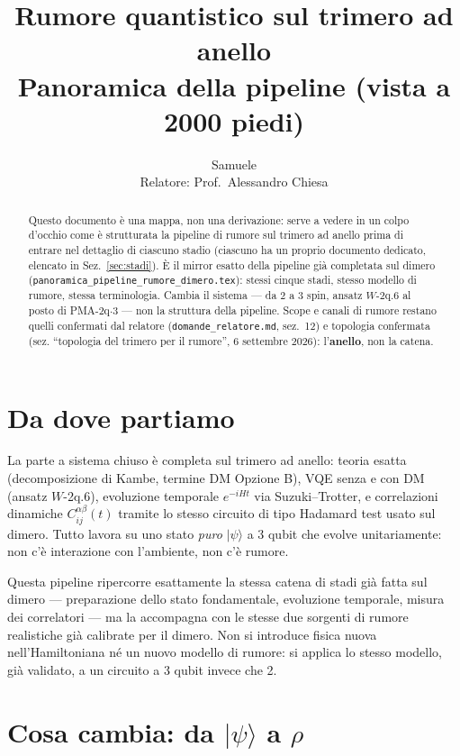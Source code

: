 \documentclass[11pt,a4paper]{article}
\title{Rumore quantistico sul trimero ad anello\\
\large Panoramica della pipeline (vista a 2000 piedi)}
\author{Samuele \\ Relatore: Prof.\ Alessandro Chiesa}
\date{}
\newcommand{\ket}[1]{\lvert #1 \rangle}
\begin{document}
\maketitle

\begin{abstract}
\noindent Questo documento è una mappa, non una derivazione: serve a
vedere in un colpo d'occhio come è strutturata la pipeline di rumore sul
trimero ad anello prima di entrare nel dettaglio di ciascuno stadio
(ciascuno ha un proprio documento dedicato, elencato in
Sez.~\ref{sec:stadi}). È il mirror esatto della pipeline già completata
sul dimero (\texttt{panoramica\_\allowbreak pipeline\_rumore\_\allowbreak dimero.tex}): stessi
cinque stadi, stesso modello di rumore, stessa terminologia. Cambia il
sistema --- da 2 a 3 spin, ansatz $W$-2q.6 al posto di PMA-2q$\cdot$3 ---
non la struttura della pipeline. Scope e canali di rumore restano quelli
confermati dal relatore (\texttt{domande\_relatore.md}, sez.~12) e
topologia confermata (sez. ``topologia del trimero per il rumore'',
6 settembre 2026): l'\textbf{anello}, non la catena.
\end{abstract}

\tableofcontents

\section{Da dove partiamo}

La parte a sistema chiuso è completa sul trimero ad anello: teoria
esatta (decomposizione di Kambe, termine DM Opzione B), VQE senza e con
DM (ansatz $W$-2q.6), evoluzione temporale $e^{-iHt}$ via
Suzuki--Trotter, e correlazioni dinamiche $C_{ij}^{\alpha\beta}(t)$
tramite lo stesso circuito di tipo Hadamard test usato sul dimero. Tutto
lavora su uno stato \emph{puro} $\ket{\psi}$ a 3 qubit che evolve
unitariamente: non c'è interazione con l'ambiente, non c'è rumore.

Questa pipeline ripercorre esattamente la stessa catena di stadi già
fatta sul dimero --- preparazione dello stato fondamentale, evoluzione
temporale, misura dei correlatori --- ma la accompagna con le stesse due
sorgenti di rumore realistiche già calibrate per il dimero. Non si
introduce fisica nuova nell'Hamiltoniana né un nuovo modello di rumore:
si applica lo stesso modello, già validato, a un circuito a 3 qubit
invece che 2.

\section{Cosa cambia: da \texorpdfstring{$\ket{\psi}$}{|psi>} a \texorpdfstring{$\rho$}{rho}}
\end{document}

